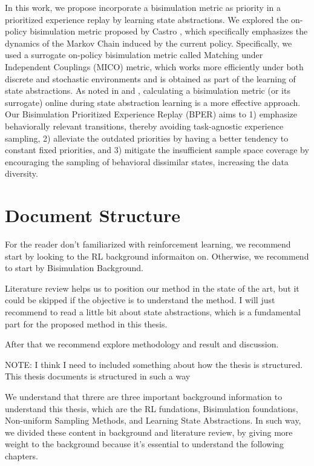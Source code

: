 In this work, we propose incorporate a bisimulation metric as priority in a prioritized experience replay by learning state abstractions. We explored the on-policy bisimulation metric proposed by Castro \cite{castro2020scalable}, which specifically emphasizes the dynamics of the Markov Chain induced by the current policy. Specifically, we used a surrogate on-policy bisimulation metric called Matching under Independent Couplings (MICO) \cite{castro2021mico} metric, which works more efficiently under both discrete and stochastic environments and is obtained as part of the learning of state abstractions. As noted in \cite{zhang2020learning} and \cite{castro2021mico}, calculating a bisimulation metric (or its surrogate) online during state abstraction learning is a more effective approach. Our Bisimulation Prioritized Experience Replay (BPER) aims to 1) emphasize behaviorally relevant transitions, thereby avoiding task-agnostic experience sampling, 2) alleviate the outdated priorities by having a better tendency to constant fixed priorities, and 
3) mitigate the insufficient sample space coverage by encouraging the sampling of behavioral dissimilar states, increasing the data diversity.

\section{Document Structure}

For the reader don't familiarized with reinforcement learning, we recommend start by looking to the RL background informaiton on. Otherwise, we recommend to start by Bisimulation Background.

Literature review helps us to position our method in the state of the art, but it could be skipped if the objective is to understand the method. I will just recommend to read a little bit about state abstractions, which is a fundamental part for the proposed method in this thesis.

After that we recommend explore methodology and result and discussion.


NOTE: I think I need to included something about how the thesis is structured.
This thesis documents is structured in such a way 

We understand that threre are three important background information to understand this thesis, which are the RL fundations, Bisimulation foundations, Non-uniform Sampling Methods, and Learning State Abstractions. In such way, we divided these content in background and literature review, by giving more weight to the background because it's essential to understand the following chapters.